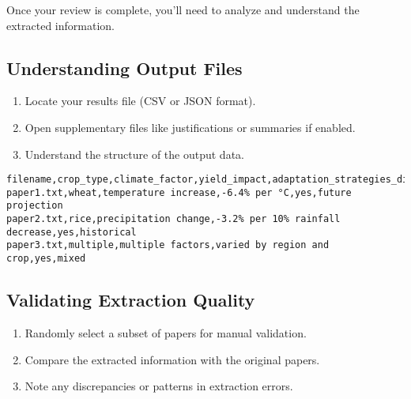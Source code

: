 Once your review is complete, you'll need to analyze and understand the extracted information.

\subsection{Understanding Output Files}

\begin{enumerate}
    \item Locate your results file (CSV or JSON format).
    \item Open supplementary files like justifications or summaries if enabled.
    \item Understand the structure of the output data.
\end{enumerate}

\begin{commandbox}
\begin{lstlisting}
filename,crop_type,climate_factor,yield_impact,adaptation_strategies_discussed,study_timeframe
paper1.txt,wheat,temperature increase,-6.4% per °C,yes,future projection
paper2.txt,rice,precipitation change,-3.2% per 10% rainfall decrease,yes,historical
paper3.txt,multiple,multiple factors,varied by region and crop,yes,mixed
\end{lstlisting}
\end{commandbox}


\subsection{Validating Extraction Quality}

\begin{enumerate}
    \item Randomly select a subset of papers for manual validation.
    \item Compare the extracted information with the original papers.
    \item Note any discrepancies or patterns in extraction errors.
\end{enumerate}


